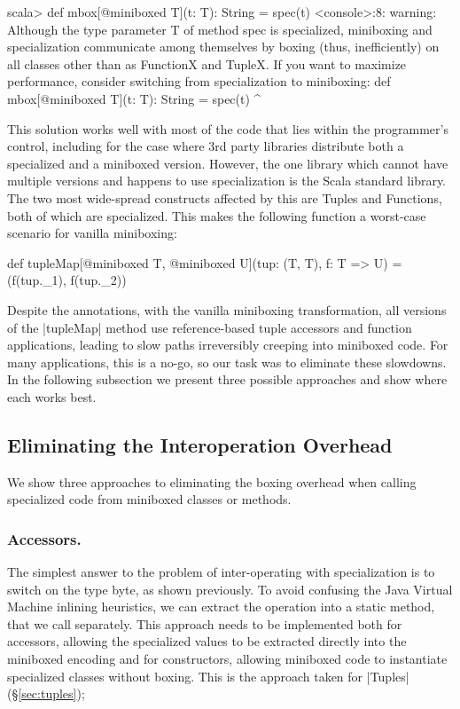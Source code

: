\begin{lstlisting-nobreak-nolang}
scala>  def mbox[@miniboxed T](t: T): String = spec(t)
<console>:8: warning: Although the type parameter T of method spec is specialized, miniboxing and specialization communicate among themselves by boxing (thus, inefficiently) on all classes other than as FunctionX and TupleX. If you want to maximize performance, consider switching from specialization to miniboxing:
        def mbox[@miniboxed T](t: T): String = spec(t)
                                                            ^
\end{lstlisting-nobreak-nolang}

This solution works well with most of the code that lies within the programmer's control, including for the case where 3rd party libraries distribute both a specialized and a miniboxed version. However, the one library which cannot have multiple versions and happens to use specialization is the Scala standard library. The two most wide-spread constructs affected by this are Tuples and Functions, both of which are specialized. This makes the following function a worst-case scenario for vanilla miniboxing:

\begin{lstlisting-nobreak}
 def tupleMap[@miniboxed T,
                  @miniboxed U](tup: (T, T), f: T => U) =
   (f(tup._1), f(tup._2))
\end{lstlisting-nobreak}

Despite the annotations, with the vanilla miniboxing transformation, all versions of the |tupleMap| method use reference-based tuple accessors and function applications, leading to slow paths irreversibly creeping into miniboxed code. For many applications, this is a no-go, so our task was to eliminate these slowdowns. In the following subsection we present three possible approaches and show where each works best.

\subsection{Eliminating the Interoperation Overhead}

We show three approaches to eliminating the boxing overhead when calling specialized code from miniboxed classes or methods.

\subsubsection{Accessors.} The simplest answer to the problem of inter-operating with specialization is to switch on the type byte, as shown previously. To avoid confusing the Java Virtual Machine inlining heuristics, we can extract the operation into a static method, that we call separately. This approach needs to be implemented both for accessors, allowing the specialized values to be extracted directly into the miniboxed encoding and for constructors, allowing miniboxed code to instantiate specialized classes without boxing. This is the approach taken for |Tuples| (\S\ref{sec:tuples});

